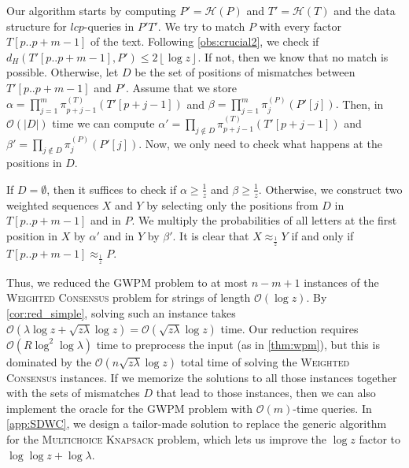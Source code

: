 \documentclass{article}
\theoremstyle{plain}
\theoremstyle{definition}
\newcommand{\MK}{\textsc{Multichoice Knapsack}\xspace}
\newcommand{\GWPM}{\textsc{GWPM}\xspace}
\newcommand{\WC}{\textsc{Weighted Consensus}\xspace}
\newcommand{\floor}[1]{\left\lfloor #1 \right\rfloor}
\newcommand{\Oh}{\mathcal{O}}
\newcommand{\lcp}{\mathit{lcp}}
\renewcommand{\H}{\mathcal{H}}
\newcommand{\match}{\approx_{\frac1z}}
\newcommand{\HammingDistance}{d_H}
\begin{document}
    Our algorithm starts by computing $P'=\H(P)$ and $T'=\H(T)$ and the data structure for $\lcp$-queries in $P'T'$.
    We try to match $P$ with every factor $T[p..p+m-1]$ of the text.
    Following \cref{obs:crucial2}, we check if $\HammingDistance(T'[p..p+m-1],P') \le 2\floor{\log z}.$
    If not, then we know that no match is possible.
    Otherwise, let $D$ be the set of positions of mismatches between $T'[p..p+m-1]$ and $P'$.
    Assume that we store
    $\alpha = \prod_{j=1}^{m} \pi^{(T)}_{p+j-1}(T'[p+j-1])$ and $\beta = \prod_{j=1}^m \pi^{(P)}_j(P'[j]).$
    Then, in $\Oh(|D|)$ time we can compute $\alpha'=\prod_{j\notin D} \pi^{(T)}_{p+j-1}(T'[p+j-1])$ and
    $\beta' = \prod_{j \notin D} \pi^{(P)}_j(P'[j])$.
Now, we only need to check what happens at the positions in $D$.

    If $D = \emptyset$, then it suffices to check if $\alpha \ge \frac1z$ and $\beta \ge \frac1z$.
    Otherwise, we construct two weighted sequences $X$ and $Y$ by selecting only the positions from $D$ in $T[p..p+m-1]$ and in $P$.
    We multiply the probabilities of all letters at the first position in $X$ by $\alpha'$ and in $Y$ by $\beta'$.
    It is clear that $X\match Y$ if and only if $T[p..p+m-1]\match P$.
    
    Thus, we reduced the \GWPM problem to at most $n-m+1$ instances of the \WC problem for strings of length $\Oh(\log z)$. 
    By \cref{cor:red_simple}, solving such an instance takes $\Oh(\lambda\log z + \sqrt{z\lambda}\log z)=\Oh(\sqrt{z\lambda}\log z)$ time.   
    Our reduction requires $\Oh(R\log^2 \log \lambda)$ time to preprocess the input (as in \cref{thm:wpm}),
    but this is dominated by the $\Oh(n\sqrt{z\lambda}\log z )$ total time of solving the \WC instances.
    If we memorize the solutions to all those instances
    together with the sets of mismatches $D$ that lead to those instances, then we can also implement the oracle for the \GWPM problem with $\Oh(m)$-time queries.
     In \cref{app:SDWC}, we design a tailor-made solution to replace the generic algorithm for the \MK problem,
     which lets us improve the $\log z$ factor to $\log\log z + \log \lambda$. 
        
\end{document}
